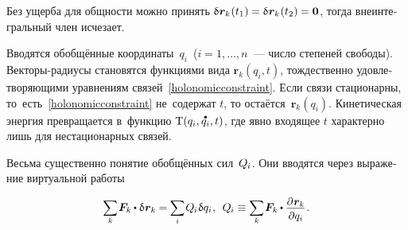 \begin{otherlanguage}{russian}
\vspace{-0.16em} \noindent Без ущерба для общности можно принять ${\variation{\hspace{.1ex}\bm{r}_k}\hspace{.1ex}(t_1) \hspace{-0.1ex} = \variation{\hspace{.1ex}\bm{r}_k}\hspace{.1ex}(t_2) \hspace{-0.1ex} = \bm{0}}$, тогда внеинтегральный член исчезает.

Вводятся обобщённые координаты~$q_i$~(${i = 1, \ldots, n}$~--- число степеней свободы). Векторы-радиусы становятся функциями \hbox{вида} ${\bm{r}_k(q_i, t)}$, тождественно удовлетворяющими уравнениям связей~\eqref{holonomicconstraint}. Если связи стационарны, то~есть~\eqref{holonomicconstraint} не~содержат $t$, то остаётся~${\bm{r}_k(q_i)}$. Кинетическая энергия превращается в~функцию ${\mathrm{T}(q_i, \mathdotabove{q}_i, t)}$, где явно входящее $t$ характерно лишь для нестационарных связей.

Весьма существенно понятие обобщённых сил~${Q_{\hspace{-0.1ex}i}}$. Они вводятся через выражение виртуальной работы

\nopagebreak\vspace{-0.25em}\begin{equation}
\scalebox{0.92}[0.96]{$ \displaystyle \sum_{\smash{k}} $} \hspace{.16ex}
\bm{F}_k \hspace{-0.1ex} \dotp \variation{\hspace{.1ex}\bm{r}_k} \hspace{-0.1ex}
= \hspace{-0.1ex} \scalebox{0.92}[0.96]{$\displaystyle \sum_{i}$} \hspace{.16ex} Q_{\hspace{-0.1ex}i} \hspace{.12ex} \variation{q_i} \hspace{.1ex} ,
\:\:
Q_{\hspace{-0.1ex}i} \equiv
\scalebox{0.92}[0.96]{$ \displaystyle \sum_{\smash{k}} $} \hspace{.16ex}
\bm{F}_k \hspace{-0.1ex} \dotp \scalebox{0.96}{$ \displaystyle \frac{\raisemath{-0.12em}{\partial \hspace{.1ex} \bm{r}_k}}{\raisemath{-0.1em}{\partial q_i}} $} \hspace{.16ex} .
\vspace{-0.1em}\end{equation}


\end{otherlanguage}
